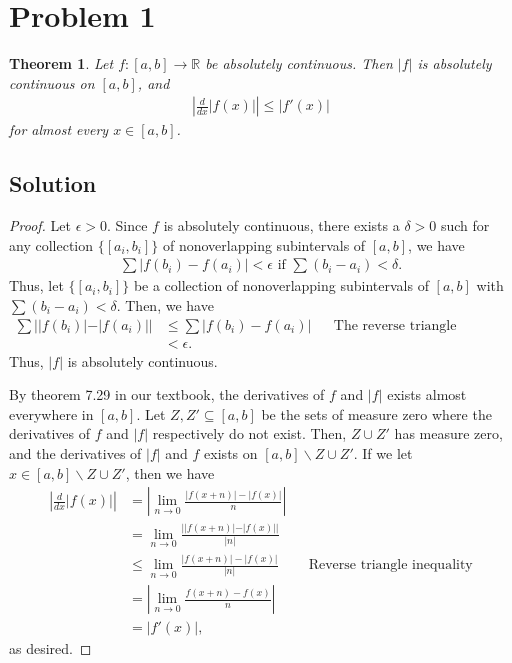 \documentclass[10pt,a4paper]{article}
\author{Jeremiah Givens}
\theoremstyle{theorem}
\newtheorem{theorem}{Theorem}
\theoremstyle{definition}
\begin{document}
\section*{Problem 1}
\begin{theorem}
Let $f:[a, b] \to \mathbb{R}$ be absolutely continuous. Then $|f|$ is absolutely continuous on $[a, b]$, and 
\begin{align*}
\left| \frac{d}{dx}|f(x)| \right| \leq |f'(x)|
\end{align*}
for almost every $x \in [a, b]$.
\end{theorem}

\subsection*{Solution}
\begin{proof}
Let $\epsilon > 0$. Since $f$ is absolutely continuous, there exists a $\delta > 0$ such for any collection $\{[a_i, b_i]\}$ of nonoverlapping subintervals of $[a, b]$, we have
\begin{align*}
\sum |f(b_i) - f(a_i)| < \epsilon \text{ if } \sum (b_i - a_i) < \delta.
\end{align*}
Thus, let $\{[a_i, b_i]\}$ be a collection of nonoverlapping subintervals of $[a, b]$ with $\sum (b_i - a_i) < \delta$. Then, we have
\begin{align*}
\sum ||f(b_i)| - |f(a_i)|| &\leq \sum |f(b_i) - f(a_i)| &&\text{The reverse triangle inequality}\\
&< \epsilon.
\end{align*}
Thus, $|f|$ is absolutely continuous.

By theorem 7.29 in our textbook, the derivatives of $f$ and $|f|$ exists almost everywhere in $[a, b]$. Let $Z, Z' \subseteq [a, b]$ be the sets of measure zero where the derivatives of $f$ and $|f|$ respectively do not exist. Then, $Z \cup Z'$ has measure zero, and the derivatives of $|f|$ and $f$ exists on $[a, b] \backslash Z \cup Z'$. If we let $x \in [a, b] \backslash Z \cup Z'$, then we have
\begin{align*}
\left| \frac{d}{dx}|f(x)| \right| &= \left| \lim_{n \to 0} \frac{|f(x+n)| - |f(x)|}{n} \right|\\
&= \lim_{n \to 0} \frac{||f(x+n)| - |f(x)||}{|n|}\\
&\leq \lim_{n \to 0} \frac{|f(x+n)| - |f(x)|}{|n|} &&\text{Reverse triangle inequality}\\
&= \left| \lim_{n \to 0} \frac{f(x+n) - f(x)}{n} \right|\\
&= |f'(x)|,
\end{align*}
as desired.
\end{proof}
\end{document}
